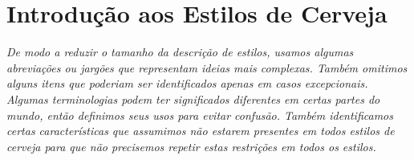 \section*{Introdução aos Estilos de Cerveja}
\textit{De modo a reduzir o tamanho da descrição de estilos, usamos algumas abreviações ou jargões que representam ideias mais complexas. Também omitimos alguns itens que poderiam ser identificados apenas em casos excepcionais. Algumas terminologias podem ter significados diferentes em certas partes do mundo, então definimos seus usos para evitar confusão. Também identificamos certas características que assumimos não estarem presentes em todos estilos de cerveja para que não precisemos repetir estas restrições em todos os estilos.} \\